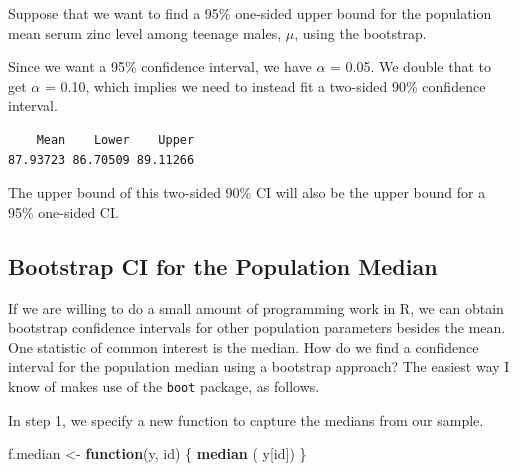 \documentclass[
]{book}
\newenvironment{Shaded}{\begin{snugshade}}{\end{snugshade}}
\newcommand{\ControlFlowTok}[1]{\textcolor[rgb]{0.13,0.29,0.53}{\textbf{#1}}}
\newcommand{\DataTypeTok}[1]{\textcolor[rgb]{0.13,0.29,0.53}{#1}}
\newcommand{\DecValTok}[1]{\textcolor[rgb]{0.00,0.00,0.81}{#1}}
\newcommand{\FloatTok}[1]{\textcolor[rgb]{0.00,0.00,0.81}{#1}}
\newcommand{\KeywordTok}[1]{\textcolor[rgb]{0.13,0.29,0.53}{\textbf{#1}}}
\newcommand{\NormalTok}[1]{#1}
\newcommand{\OperatorTok}[1]{\textcolor[rgb]{0.81,0.36,0.00}{\textbf{#1}}}
\newcommand{\StringTok}[1]{\textcolor[rgb]{0.31,0.60,0.02}{#1}}
\begin{document}
Suppose that we want to find a 95\% one-sided upper bound for the population mean serum zinc level among teenage males, \(\mu\), using the bootstrap.

Since we want a 95\% confidence interval, we have \(\alpha\) = 0.05. We double that to get \(\alpha\) = 0.10, which implies we need to instead fit a two-sided 90\% confidence interval.

\begin{Shaded}
\end{Shaded}

\begin{verbatim}
    Mean    Lower    Upper 
87.93723 86.70509 89.11266 
\end{verbatim}

The upper bound of this two-sided 90\% CI will also be the upper bound for a 95\% one-sided CI.

\hypertarget{bootstrap-ci-for-the-population-median}{%
\subsection{Bootstrap CI for the Population Median}\label{bootstrap-ci-for-the-population-median}}

If we are willing to do a small amount of programming work in R, we can obtain bootstrap confidence intervals for other population parameters besides the mean. One statistic of common interest is the median. How do we find a confidence interval for the population median using a bootstrap approach? The easiest way I know of makes use of the \texttt{boot} package, as follows.

In step 1, we specify a new function to capture the medians from our sample.

\begin{Shaded}
\begin{Highlighting}[]
\NormalTok{f.median <-}\StringTok{ }\ControlFlowTok{function}\NormalTok{(y, id) }
\NormalTok{\{    }\KeywordTok{median}\NormalTok{ ( y[id])  \}}
\end{Highlighting}
\end{Shaded}
\end{document}
